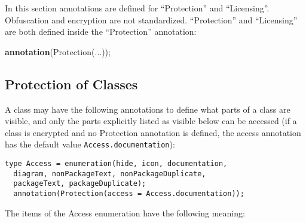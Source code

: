 In this section annotations are defined for ``Protection'' and
``Licensing''. Obfuscation and encryption are not standardized.
``Protection'' and ``Licensing'' are both defined inside the
``Protection'' annotation:

\textbf{annotation}(Protection(...));

\subsection{Protection of Classes}

A class may have the following annotations to define what parts of a
class are visible, and only the parts explicitly listed as visible below can be accessed
(if a class is encrypted and no Protection annotation is defined, the access annotation has the default value
\lstinline!Access.documentation!):

\begin{lstlisting}[language=modelica]
  type Access = enumeration(hide, icon, documentation,
  diagram, nonPackageText, nonPackageDuplicate,
  packageText, packageDuplicate);
  annotation(Protection(access = Access.documentation));
\end{lstlisting}
The items of the Access enumeration have the following meaning:

